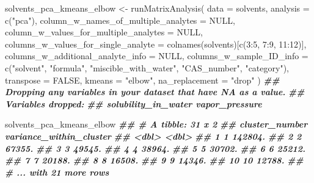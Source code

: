 \documentclass[
]{krantz}
\newenvironment{Shaded}{\begin{snugshade}}{\end{snugshade}}
\newcommand{\AttributeTok}[1]{\textcolor[rgb]{0.77,0.63,0.00}{#1}}
\newcommand{\ConstantTok}[1]{\textcolor[rgb]{0.00,0.00,0.00}{#1}}
\newcommand{\DecValTok}[1]{\textcolor[rgb]{0.00,0.00,0.81}{#1}}
\newcommand{\DocumentationTok}[1]{\textcolor[rgb]{0.56,0.35,0.01}{\textbf{\textit{#1}}}}
\newcommand{\FunctionTok}[1]{\textcolor[rgb]{0.00,0.00,0.00}{#1}}
\newcommand{\NormalTok}[1]{#1}
\newcommand{\OtherTok}[1]{\textcolor[rgb]{0.56,0.35,0.01}{#1}}
\newcommand{\SpecialCharTok}[1]{\textcolor[rgb]{0.00,0.00,0.00}{#1}}
\newcommand{\StringTok}[1]{\textcolor[rgb]{0.31,0.60,0.02}{#1}}
\begin{document}
\begin{Shaded}
\begin{Highlighting}[]
\NormalTok{solvents\_pca\_kmeans\_elbow }\OtherTok{\textless{}{-}} \FunctionTok{runMatrixAnalysis}\NormalTok{(}
  \AttributeTok{data =}\NormalTok{ solvents,}
  \AttributeTok{analysis =} \FunctionTok{c}\NormalTok{(}\StringTok{"pca"}\NormalTok{),}
  \AttributeTok{column\_w\_names\_of\_multiple\_analytes =} \ConstantTok{NULL}\NormalTok{,}
  \AttributeTok{column\_w\_values\_for\_multiple\_analytes =} \ConstantTok{NULL}\NormalTok{,}
  \AttributeTok{columns\_w\_values\_for\_single\_analyte =} \FunctionTok{colnames}\NormalTok{(solvents)[}\FunctionTok{c}\NormalTok{(}\DecValTok{3}\SpecialCharTok{:}\DecValTok{5}\NormalTok{, }\DecValTok{7}\SpecialCharTok{:}\DecValTok{9}\NormalTok{, }\DecValTok{11}\SpecialCharTok{:}\DecValTok{12}\NormalTok{)],}
  \AttributeTok{columns\_w\_additional\_analyte\_info =} \ConstantTok{NULL}\NormalTok{,}
  \AttributeTok{columns\_w\_sample\_ID\_info =} \FunctionTok{c}\NormalTok{(}\StringTok{"solvent"}\NormalTok{, }\StringTok{"formula"}\NormalTok{, }\StringTok{"miscible\_with\_water"}\NormalTok{, }\StringTok{"CAS\_number"}\NormalTok{, }\StringTok{"category"}\NormalTok{),}
  \AttributeTok{transpose =} \ConstantTok{FALSE}\NormalTok{,}
  \AttributeTok{kmeans =} \StringTok{"elbow"}\NormalTok{,}
  \AttributeTok{na\_replacement =} \StringTok{"drop"}
\NormalTok{)}
\DocumentationTok{\#\# Dropping any variables in your dataset that have NA as a value.}
\DocumentationTok{\#\# Variables dropped:}
\DocumentationTok{\#\# solubility\_in\_water vapor\_pressure}

\NormalTok{solvents\_pca\_kmeans\_elbow}
\DocumentationTok{\#\# \# A tibble: 31 x 2}
\DocumentationTok{\#\#    cluster\_number variance\_within\_cluster}
\DocumentationTok{\#\#             \textless{}dbl\textgreater{}                   \textless{}dbl\textgreater{}}
\DocumentationTok{\#\#  1              1                 142804.}
\DocumentationTok{\#\#  2              2                  67355.}
\DocumentationTok{\#\#  3              3                  49545.}
\DocumentationTok{\#\#  4              4                  38964.}
\DocumentationTok{\#\#  5              5                  30702.}
\DocumentationTok{\#\#  6              6                  25212.}
\DocumentationTok{\#\#  7              7                  20188.}
\DocumentationTok{\#\#  8              8                  16508.}
\DocumentationTok{\#\#  9              9                  14346.}
\DocumentationTok{\#\# 10             10                  12788.}
\DocumentationTok{\#\# \# ... with 21 more rows}
\end{Highlighting}
\end{Shaded}
\end{document}
